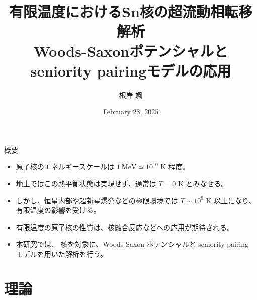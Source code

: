 \documentclass[aspectratio=169, 12pt, dvipdfmx]{beamer}
\title{有限温度におけるSn核の超流動相転移解析\\Woods-Saxonポテンシャルと\\seniority pairingモデルの応用}
\author{根岸 颯}
\date{February 28, 2025} %
\begin{document}
\begin{frame}
  \titlepage
\end{frame}


\begin{frame}{概要}
  \begin{itemize}
    \item 原子核のエネルギースケールは $1\ \mathrm{MeV} \simeq 10^{10}$ K 程度。
    \item 地上ではこの熱平衡状態は実現せず、通常は $T = 0$ K とみなせる。
    \item しかし、恒星内部や超新星爆発などの極限環境では $T \sim 10^9$ K 以上になり、有限温度の影響を受ける。
    \item 有限温度の原子核の性質は、核融合反応などへの応用が期待される。
    \item 本研究では、 核を対象に、Woods-Saxon ポテンシャルと seniority pairing モデルを用いた解析を行う。
  \end{itemize}
\end{frame}


\section{理論}
\end{document}
